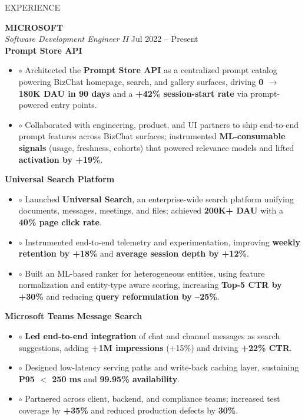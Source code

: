 \documentclass[10pt]{resume}
\begin{document}
\begin{rSection}{EXPERIENCE}

\textbf{MICROSOFT} \\
\textit{Software Development Engineer II} \hfill Jul 2022 -- Present \\[1pt]
\textbf{Prompt Store API}
\begin{itemize}
\item[] $\circ$ Architected the \textbf{Prompt Store API} as a centralized prompt catalog powering BizChat homepage, search, and gallery surfaces, driving \textbf{0 $\rightarrow$ 180K DAU in 90 days} and a \textbf{+42\% session-start rate} via prompt-powered entry points.
\item[] $\circ$ Collaborated with engineering, product, and UI partners to ship end-to-end prompt features across BizChat surfaces; instrumented \textbf{ML-consumable signals} (usage, freshness, cohorts) that powered relevance models and lifted \textbf{activation by +19\%}.
\end{itemize}


\textbf{Universal Search Platform}
\begin{itemize}
\item[] $\circ$ Launched \textbf{Universal Search}, an enterprise-wide search platform unifying documents, messages, meetings, and files; achieved \textbf{200K+ DAU} with a \textbf{40\% page click rate}.
\item[] $\circ$ Instrumented end-to-end telemetry and experimentation, improving \textbf{weekly retention by +18\%} and \textbf{average session depth by +12\%}.
\item[] $\circ$ Built an ML-based ranker for heterogeneous entities, using feature normalization and entity-type aware scoring, increasing \textbf{Top-5 CTR by +30\%} and reducing \textbf{query reformulation by --25\%}.
\end{itemize}

\textbf{Microsoft Teams Message Search}
\begin{itemize}
\item[] $\circ$ \textbf{Led end-to-end integration} of chat and channel messages as search suggestions, adding \textbf{+1M impressions} (+15\%) and driving \textbf{+22\% CTR}.
\item[] $\circ$ Designed low-latency serving paths and write-back caching layer, sustaining \textbf{P95 $<$ 250 ms} and \textbf{99.95\% availability}.
\item[] $\circ$ Partnered across client, backend, and compliance teams; increased test coverage by \textbf{+35\%} and reduced production defects by \textbf{30\%}.
\end{itemize}


\end{rSection}
\end{document}

